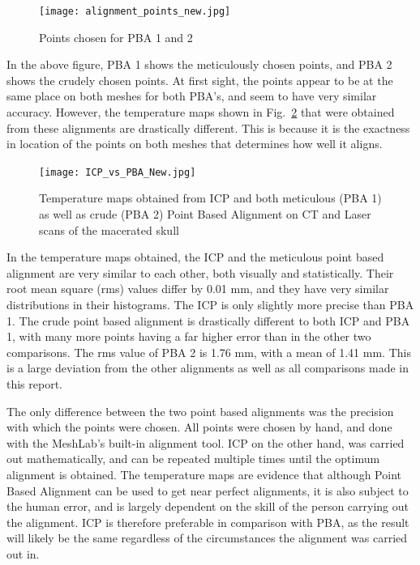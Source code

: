 \documentclass[a4paper]{article}
\begin{document}
\begin {figure} [ht!]
\centering
\texttt{[image: alignment\_points\_new.jpg]}
\caption{\label{fig:XX}Points chosen for PBA 1 and 2}
\end{figure}

In the above figure, PBA 1 shows the meticulously chosen points, and PBA 2 shows the crudely chosen points. At first sight, the points appear to be at the same place on both meshes for both PBA's, and seem to have very similar accuracy. However, the temperature maps shown in Fig.~\ref{fig:YY} that were obtained from these alignments are drastically different. This is because it is the exactness in location of the points on both meshes that determines how well it aligns.
\pagebreak
\begin {figure} [ht!]
\centering
\texttt{[image: ICP\_vs\_PBA\_New.jpg]}
\caption{\label{fig:YY}Temperature maps obtained from ICP and both meticulous (PBA 1) as well as crude (PBA 2) Point Based Alignment on CT and Laser scans of the macerated skull}
\end{figure}

\pagebreak

In the temperature maps obtained, the ICP and the meticulous point based alignment are very similar to each other, both visually and statistically. Their root mean square (rms) values differ by 0.01 mm, and they have very similar distributions in their histograms. The ICP is only slightly more precise than PBA 1. The crude point based alignment is drastically different to both ICP and PBA 1, with many more points having a far higher error than in the other two comparisons. The rms value of PBA 2 is 1.76 mm, with a mean of 1.41 mm. This is a large deviation from the other alignments as well as all comparisons made in this report.

The only difference between the two point based alignments was the precision with which the points were chosen. All points were chosen by hand, and done with the  MeshLab's built-in alignment tool. ICP on the other hand, was carried out mathematically, and can be repeated multiple times until the optimum alignment is obtained. The temperature maps are evidence that although Point Based Alignment can be used to get near perfect alignments, it is also subject to the human error, and is largely dependent on the skill of the person carrying out the alignment. ICP is therefore preferable in comparison with PBA, as the result will likely be the same regardless of the circumstances the alignment was carried out in. 
\end{document}
